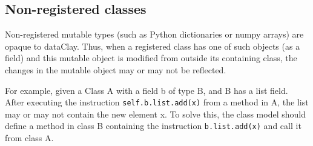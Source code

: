 % 
% 

\subsection{Non-registered classes}
Non-registered mutable types (such as Python dictionaries or numpy arrays) are opaque to dataClay. Thus, when a registered class has one of such objects (as a field) and this mutable object is modified from outside its containing class, the changes in the mutable object may or may not be reflected.

For example, given a Class A with a field b of type B, and B has a list field. After executing the instruction \texttt{self.b.list.add(x)} from a method in A, the list may or may not contain the new element x. To solve this, the class model should define a method in class B containing the instruction \texttt{b.list.add(x)} and call it from class A.

